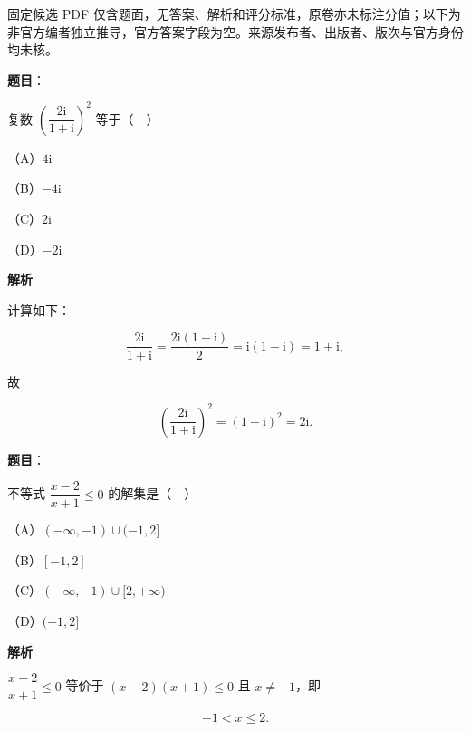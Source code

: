 

\begin{gktip}
固定候选 PDF 仅含题面，无答案、解析和评分标准，原卷亦未标注分值；以下为非官方编者独立推导，官方答案字段为空。来源发布者、出版者、版次与官方身份均未核。
\end{gktip}

\begin{answer}

\textbf{题目}：

复数 $\left(\dfrac{2\mathrm i}{1+\mathrm i}\right)^2$ 等于（　）

（A）$4\mathrm i$

（B）$-4\mathrm i$

（C）$2\mathrm i$

（D）$-2\mathrm i$

\textbf{解析}

计算如下：

\nopagebreak[4]
\[\frac{2\mathrm i}{1+\mathrm i}=\frac{2\mathrm i(1-\mathrm i)}2=\mathrm i(1-\mathrm i)=1+\mathrm i,\]

故

\nopagebreak[4]
\[\left(\frac{2\mathrm i}{1+\mathrm i}\right)^2=(1+\mathrm i)^2=2\mathrm i.\]


\end{answer}
\begin{answer}

\textbf{题目}：

不等式 $\dfrac{x-2}{x+1}\leqslant0$ 的解集是（　）

（A）$(-\infty,-1)\cup(-1,2]$

（B）$[-1,2]$

（C）$(-\infty,-1)\cup[2,+\infty)$

（D）$(-1,2]$

\textbf{解析}

$\dfrac{x-2}{x+1}\leqslant0$ 等价于 $(x-2)(x+1)\leqslant0$ 且 $x\neq-1$，即

\nopagebreak[4]
\[-1<x\leqslant2.\]


\end{answer}
